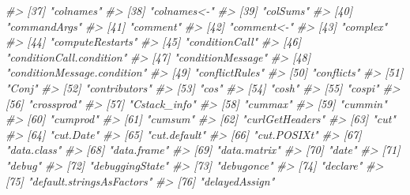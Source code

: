 \documentclass[
]{book}
\newenvironment{Shaded}{\begin{snugshade}}{\end{snugshade}}
\newcommand{\CommentTok}[1]{\textcolor[rgb]{0.56,0.35,0.01}{\textit{#1}}}
\begin{document}
\begin{Shaded}
\begin{Highlighting}[]
\CommentTok{\#\textgreater{}  [37] "colnames"                  }
\CommentTok{\#\textgreater{}  [38] "colnames\textless{}{-}"                }
\CommentTok{\#\textgreater{}  [39] "colSums"                   }
\CommentTok{\#\textgreater{}  [40] "commandArgs"               }
\CommentTok{\#\textgreater{}  [41] "comment"                   }
\CommentTok{\#\textgreater{}  [42] "comment\textless{}{-}"                 }
\CommentTok{\#\textgreater{}  [43] "complex"                   }
\CommentTok{\#\textgreater{}  [44] "computeRestarts"           }
\CommentTok{\#\textgreater{}  [45] "conditionCall"             }
\CommentTok{\#\textgreater{}  [46] "conditionCall.condition"   }
\CommentTok{\#\textgreater{}  [47] "conditionMessage"          }
\CommentTok{\#\textgreater{}  [48] "conditionMessage.condition"}
\CommentTok{\#\textgreater{}  [49] "conflictRules"             }
\CommentTok{\#\textgreater{}  [50] "conflicts"                 }
\CommentTok{\#\textgreater{}  [51] "Conj"                      }
\CommentTok{\#\textgreater{}  [52] "contributors"              }
\CommentTok{\#\textgreater{}  [53] "cos"                       }
\CommentTok{\#\textgreater{}  [54] "cosh"                      }
\CommentTok{\#\textgreater{}  [55] "cospi"                     }
\CommentTok{\#\textgreater{}  [56] "crossprod"                 }
\CommentTok{\#\textgreater{}  [57] "Cstack\_info"               }
\CommentTok{\#\textgreater{}  [58] "cummax"                    }
\CommentTok{\#\textgreater{}  [59] "cummin"                    }
\CommentTok{\#\textgreater{}  [60] "cumprod"                   }
\CommentTok{\#\textgreater{}  [61] "cumsum"                    }
\CommentTok{\#\textgreater{}  [62] "curlGetHeaders"            }
\CommentTok{\#\textgreater{}  [63] "cut"                       }
\CommentTok{\#\textgreater{}  [64] "cut.Date"                  }
\CommentTok{\#\textgreater{}  [65] "cut.default"               }
\CommentTok{\#\textgreater{}  [66] "cut.POSIXt"                }
\CommentTok{\#\textgreater{}  [67] "data.class"                }
\CommentTok{\#\textgreater{}  [68] "data.frame"                }
\CommentTok{\#\textgreater{}  [69] "data.matrix"               }
\CommentTok{\#\textgreater{}  [70] "date"                      }
\CommentTok{\#\textgreater{}  [71] "debug"                     }
\CommentTok{\#\textgreater{}  [72] "debuggingState"            }
\CommentTok{\#\textgreater{}  [73] "debugonce"                 }
\CommentTok{\#\textgreater{}  [74] "declare"                   }
\CommentTok{\#\textgreater{}  [75] "default.stringsAsFactors"  }
\CommentTok{\#\textgreater{}  [76] "delayedAssign"             }

\end{Highlighting}
\end{Shaded}
\end{document}
